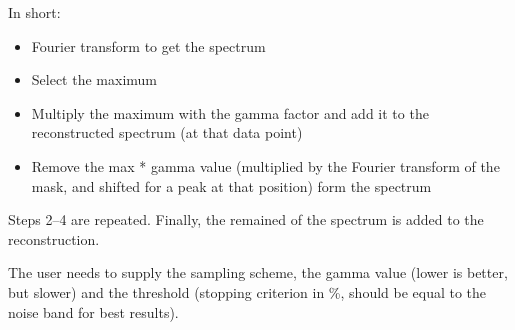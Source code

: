 \documentclass[11pt,a4paper]{article}
\begin{document}
In short:
\begin{itemize}
  \item Fourier transform to get the spectrum
	 \item Select the maximum
	 \item Multiply the maximum with the gamma factor and add it to the reconstructed spectrum (at that data point)
	 \item Remove the max * gamma value (multiplied by the Fourier transform of the mask, and shifted for a peak at that position) form the spectrum
\end{itemize}
Steps 2--4 are repeated. Finally, the remained of the spectrum is added to the reconstruction.

The user needs to supply the sampling scheme, the gamma value (lower is better, but slower) and the threshold (stopping criterion in \%, should be equal to the noise band for best results).
\end{document}
